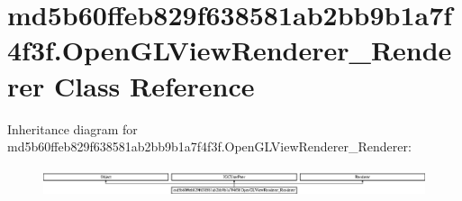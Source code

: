 \hypertarget{classmd5b60ffeb829f638581ab2bb9b1a7f4f3f_1_1OpenGLViewRenderer__Renderer}{}\section{md5b60ffeb829f638581ab2bb9b1a7f4f3f.\+Open\+G\+L\+View\+Renderer\+\_\+\+Renderer Class Reference}
\label{classmd5b60ffeb829f638581ab2bb9b1a7f4f3f_1_1OpenGLViewRenderer__Renderer}
Inheritance diagram for md5b60ffeb829f638581ab2bb9b1a7f4f3f.\+Open\+G\+L\+View\+Renderer\+\_\+\+Renderer\+:\begin{figure}[H]
\begin{center}
\leavevmode
\includegraphics[height=0.846561cm]{classmd5b60ffeb829f638581ab2bb9b1a7f4f3f_1_1OpenGLViewRenderer__Renderer}
\end{center}
\end{figure}
